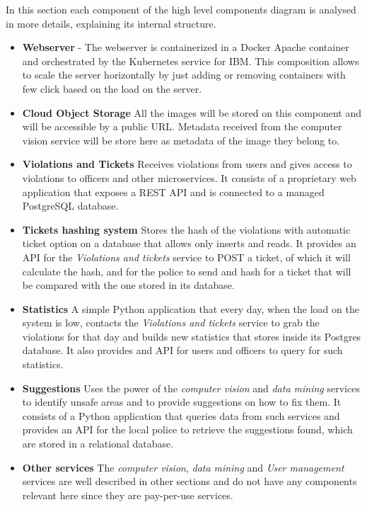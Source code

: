In this section each component of the high level components diagram is analysed in more details, explaining
its internal structure.

\begin{itemize}
    \item \textbf{Webserver} - 
    The webserver is containerized in a Docker Apache container and orchestrated by the Kubernetes service for IBM.
    This composition allows to scale the server horizontally by just adding or removing containers with few click based on the load on the server.

    \item \textbf{Cloud Object Storage}
    All the images will be stored on this component and will be accessible by a public URL. Metadata received from the computer vision service will be store here as metadata of the image they belong to.

    \item \textbf{Violations and Tickets}
    Receives violations from users and gives access to violations to officers and other microservices. It consists of a proprietary web application that exposes a REST API and is connected to a managed PostgreSQL database.

    \item \textbf{Tickets hashing system}
    Stores the hash of the violations with automatic ticket option on a database that allows only inserts and reads.
    It provides an API for the \textit{Violations and tickets} service to POST a ticket, of which it will calculate the hash,
    and for the police to send and hash for a ticket that will be compared with the one stored in its database.

    \item \textbf{Statistics}
    A simple Python application that every day, when the load on the system is low, contacts the \textit{Violations and tickets} service to grab the violations for that day and builds new statistics that stores inside its Postgres database.
    It also provides and API for users and officers to query for such statistics.

    \item \textbf{Suggestions}
    Uses the power of the \textit{computer vision} and \textit{data mining} services to identify unsafe areas and to provide
    suggestions on how to fix them. It consists of a Python application that queries data from such services and provides an API for the local police to retrieve the
    suggestions found, which are stored in a relational database.

    \item \textbf{Other services}
    The \textit{computer vision}, \textit{data mining} and \textit{User management} services are well described in other sections and do not have any components relevant here since they are pay-per-use services.
\end{itemize}